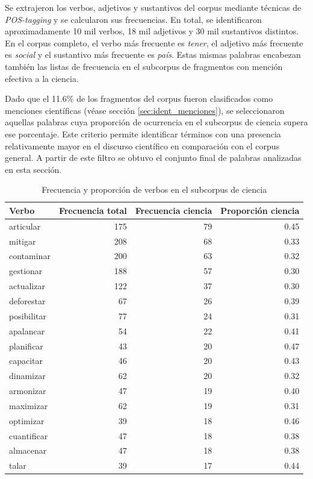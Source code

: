 \documentclass[11pt,a4paper]{article}
\begin{document}
Se extrajeron los verbos, adjetivos y sustantivos del corpus mediante técnicas de \emph{POS-tagging} y se calcularon sus frecuencias. En total, se identificaron aproximadamente 10 mil verbos, 18 mil adjetivos y 30 mil sustantivos distintos. En el corpus completo, el verbo más frecuente es \textit{tener}, el adjetivo más frecuente es \textit{social} y el sustantivo más frecuente es \textit{país}. Estas mismas palabras encabezan también las listas de frecuencia en el subcorpus de fragmentos con mención efectiva a la ciencia.

Dado que el 11.6\% de los fragmentos del corpus fueron clasificados como menciones científicas (véase sección \ref{sec:ident_menciones}), se seleccionaron aquellas palabras cuya proporción de ocurrencia en el subcorpus de ciencia supera ese porcentaje. Este criterio permite identificar términos con una presencia relativamente mayor en el discurso científico en comparación con el corpus general. A partir de este filtro se obtuvo el conjunto final de palabras analizadas en esta sección.



\begin{table}[H]
	\centering
	\begin{tabular}{lrrr}
		\toprule
		\textbf{Verbo} & \textbf{Frecuencia total} & \textbf{Frecuencia ciencia} & \textbf{Proporción ciencia} \\
		\midrule
		articular     & 175 & 79 & 0.45 \\
		mitigar       & 208 & 68 & 0.33 \\
		contaminar    & 200 & 63 & 0.32 \\
		gestionar     & 188 & 57 & 0.30 \\
		actualizar    & 122 & 37 & 0.30 \\
		deforestar    & 67  & 26 & 0.39 \\
		posibilitar   & 77  & 24 & 0.31 \\
		apalancar     & 54  & 22 & 0.41 \\
		planificar    & 43  & 20 & 0.47 \\
		capacitar     & 46  & 20 & 0.43 \\
		dinamizar     & 62  & 20 & 0.32 \\
		armonizar     & 47  & 19 & 0.40 \\
		maximizar     & 62  & 19 & 0.31 \\
		optimizar     & 39  & 18 & 0.46 \\
		cuantificar   & 47  & 18 & 0.38 \\
		almacenar     & 47  & 18 & 0.38 \\
		talar         & 39  & 17 & 0.44 \\
		\bottomrule
	\end{tabular}
	\caption{Frecuencia y proporción de verbos en el subcorpus de ciencia}
	\label{tab:verbos_ciencia}
\end{table}
\end{document}
